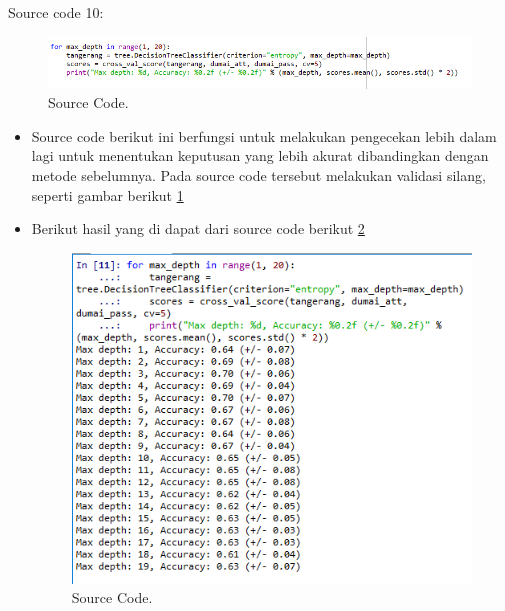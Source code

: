 Source code 10:
		\begin{figure}[ht]
		\centerline{\includegraphics[width=1\textwidth]{figures/im/imQ10.png}}
		\caption{Source Code.}
		\label{sepuluhQ}
		\end{figure}
\begin{itemize}
\item Source code berikut ini berfungsi untuk melakukan pengecekan lebih dalam lagi untuk menentukan keputusan yang lebih akurat dibandingkan dengan metode sebelumnya. Pada source code tersebut melakukan validasi silang, seperti gambar berikut \ref{sepuluhQ}
\item Berikut hasil yang di dapat dari source code berikut \ref{sepuluhC}
		\begin{figure}[ht]
		\centerline{\includegraphics[width=1\textwidth]{figures/im/imCode10.png}}
		\caption{Source Code.}
		\label{sepuluhC}
		\end{figure}
\end{itemize}

